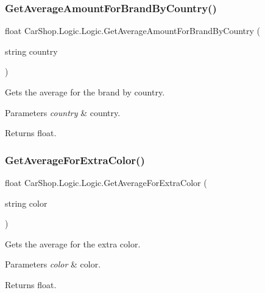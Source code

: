 \subsubsection{\texorpdfstring{Get\+Average\+Amount\+For\+Brand\+By\+Country()}{GetAverageAmountForBrandByCountry()}}
{\footnotesize\ttfamily float Car\+Shop.\+Logic.\+Logic.\+Get\+Average\+Amount\+For\+Brand\+By\+Country (\begin{DoxyParamCaption}\item[{string}]{country }\end{DoxyParamCaption})}



Gets the average for the brand by country. 


\begin{DoxyParams}{Parameters}
{\em country} & country.\\
\hline
\end{DoxyParams}
\begin{DoxyReturn}{Returns}
float.
\end{DoxyReturn}
\mbox{\label{class_car_shop_1_1_logic_1_1_logic_ae9538c7d94f55438dd503f82cfe8ac5c}} 
\subsubsection{\texorpdfstring{Get\+Average\+For\+Extra\+Color()}{GetAverageForExtraColor()}}
{\footnotesize\ttfamily float Car\+Shop.\+Logic.\+Logic.\+Get\+Average\+For\+Extra\+Color (\begin{DoxyParamCaption}\item[{string}]{color }\end{DoxyParamCaption})}



Gets the average for the extra color. 


\begin{DoxyParams}{Parameters}
{\em color} & color.\\
\hline
\end{DoxyParams}
\begin{DoxyReturn}{Returns}
float.
\end{DoxyReturn}
\mbox{\label{class_car_shop_1_1_logic_1_1_logic_ac41378bc905997f904da5353b20042a0}} 
